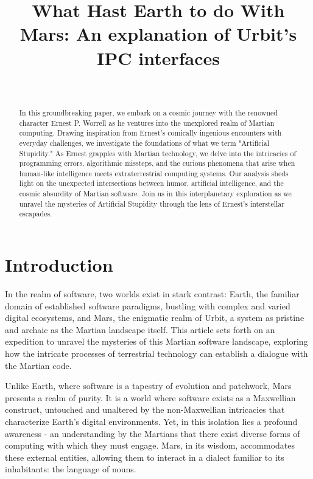 \documentclass[twoside]{article}
\title{What Hast Earth to do With Mars: An explanation of Urbit's IPC interfaces}
\author{~\authorpatp \\ \affiliation}
\date{}
\begin{document}
\maketitle
\thispagestyle{firststyle}

\begin{abstract}
In this groundbreaking paper, we embark on a cosmic journey with the renowned character Ernest P. Worrell as he ventures into the unexplored realm of Martian computing. Drawing inspiration from Ernest's comically ingenious encounters with everyday challenges, we investigate the foundations of what we term "Artificial Stupidity." As Ernest grapples with Martian technology, we delve into the intricacies of programming errors, algorithmic missteps, and the curious phenomena that arise when human-like intelligence meets extraterrestrial computing systems. Our analysis sheds light on the unexpected intersections between humor, artificial intelligence, and the cosmic absurdity of Martian software. Join us in this interplanetary exploration as we unravel the mysteries of Artificial Stupidity through the lens of Ernest's interstellar escapades.
\end{abstract}

\setcounter{page}{1}

\tableofcontents

\section{Introduction}
In the realm of software, two worlds exist in stark contrast: 
Earth, the familiar domain of established software paradigms, bustling with complex and varied digital ecosystems, 
and Mars, the enigmatic realm of Urbit, a system as pristine and archaic as the Martian landscape itself. 
This article sets forth on an expedition to unravel the mysteries of this Martian software landscape, 
exploring how the intricate processes of terrestrial technology can establish a dialogue with the Martian code.

Unlike Earth, where software is a tapestry of evolution and patchwork, Mars presents a realm of purity. 
It is a world where software exists as a Maxwellian construct, untouched and unaltered by the non-Maxwellian intricacies that characterize Earth’s digital environments. 
Yet, in this isolation lies a profound awareness - an understanding by the Martians that there exist diverse forms of computing with which they must engage. 
Mars, in its wisdom, accommodates these external entities, allowing them to interact in a dialect familiar to its inhabitants: the language of nouns.
\end{document}

